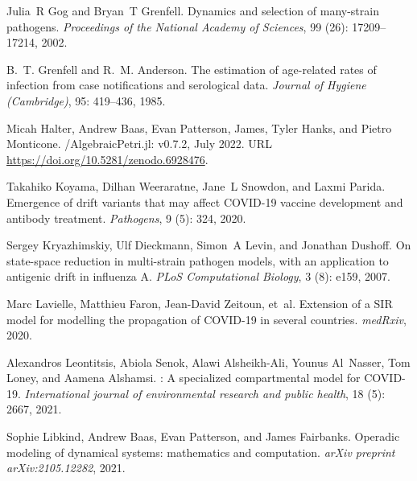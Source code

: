 \documentclass{article}
\theoremstyle{definition}
\begin{document}
\begin{thebibliography}{37}
Julia~R Gog and Bryan~T Grenfell.
\newblock Dynamics and selection of many-strain pathogens.
\newblock \emph{Proceedings of the National Academy of Sciences}, 99
  (26): 17209--17214, 2002.

B.~T. Grenfell and R.~M. Anderson.
\newblock The estimation of age-related rates of infection from case
  notifications and serological data.
\newblock \emph{Journal of Hygiene (Cambridge)}, 95: 419--436, 1985.

Micah Halter, Andrew Baas, Evan Patterson, James, Tyler Hanks, and Pietro
  Monticone.
/{AlgebraicPetri.jl}: v0.7.2, July 2022.
\newblock URL \url{https://doi.org/10.5281/zenodo.6928476}.

Takahiko Koyama, Dilhan Weeraratne, Jane~L Snowdon, and Laxmi Parida.
\newblock Emergence of drift variants that may affect {COVID-19} vaccine
  development and antibody treatment.
\newblock \emph{Pathogens}, 9 (5): 324, 2020.

Sergey Kryazhimskiy, Ulf Dieckmann, Simon~A Levin, and Jonathan Dushoff.
\newblock On state-space reduction in multi-strain pathogen models, with an
  application to antigenic drift in influenza {A}.
\newblock \emph{PLoS Computational Biology}, 3 (8): e159,
  2007.

Marc Lavielle, Matthieu Faron, Jean-David Zeitoun, et~al.
\newblock Extension of a {SIR} model for modelling the propagation of
  {COVID-19} in several countries.
\newblock \emph{medRxiv}, 2020.

Alexandros Leontitsis, Abiola Senok, Alawi Alsheikh-Ali, Younus Al~Nasser, Tom
  Loney, and Aamena Alshamsi.
: A specialized compartmental model for {COVID-19}.
\newblock \emph{International journal of environmental research and public
  health}, 18 (5): 2667, 2021.

Sophie Libkind, Andrew Baas, Evan Patterson, and James Fairbanks.
\newblock Operadic modeling of dynamical systems: mathematics and computation.
\newblock \emph{arXiv preprint arXiv:2105.12282}, 2021.


\end{thebibliography}
\end{document}
